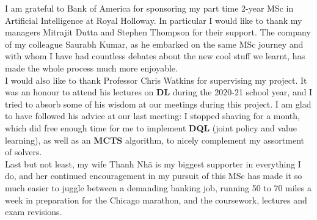 I am grateful to Bank of America for sponsoring my part time 2-year MSc in Artificial Intelligence at Royal Holloway. In particular I would like to thank my managers Mitrajit Dutta and Stephen Thompson for their support. The company of my colleague Saurabh Kumar, as he embarked on the same MSc journey and with whom I have had countless debates about the new cool stuff we learnt, has made the whole process much more enjoyable.
\\
I would also like to thank Professor Chris Watkins for supervising my project. It was an honour to attend his lectures on \textbf{DL} during the 2020-21 school year, and I tried to absorb some of his wisdom at our meetings during this project. I am glad to have followed his advice at our last meeting: I stopped shaving for a month, which did free enough time for me to implement \textbf{DQL} (joint policy and value learning), as well as an \textbf{MCTS} algorithm, to nicely complement my assortment of solvers.
\\
Last but not least, my wife Thanh Nh\~a is my biggest supporter in everything I do, and her continued encouragement in my pursuit of this MSc has made it so much easier to juggle between a demanding banking job, running 50 to 70 miles a week in preparation for the Chicago marathon, and the coursework, lectures and exam revisions.